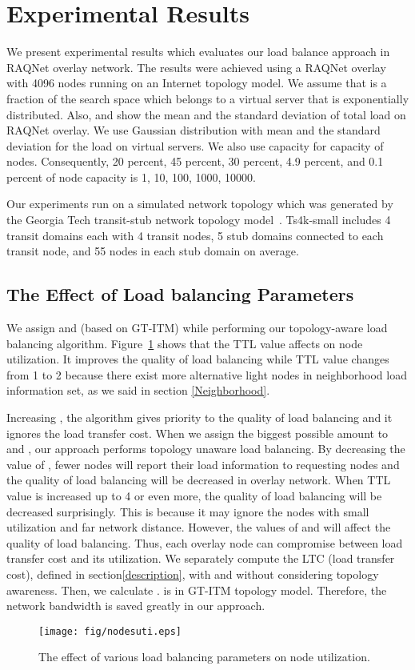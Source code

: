 \documentclass {article}
\begin{document}
\section{Experimental Results}\label{Exresult}
We present experimental results which evaluates our load balance approach in RAQNet overlay network.  The results were achieved using a RAQNet overlay with 4096 nodes  running on an Internet topology model.
We assume that  is a fraction of the search space which belongs to a virtual server that is exponentially  distributed. Also,  and  show the mean and the standard deviation of total load on RAQNet overlay. We use Gaussian distribution with mean  and the standard deviation \cite{loadbalancesp} for the load on virtual servers. We also use 
capacity for capacity of nodes. Consequently, 20 percent,
45 percent, 30 percent, 4.9 percent, and 0.1 percent of node capacity  is  1, 10, 100, 1000, 10000.

Our experiments run on a simulated network topology which was generated by the Georgia Tech transit-stub network topology model~\cite{GT-ITM}. Ts4k-small includes 4 transit domains each with 4 transit
nodes, 5 stub domains connected to each transit node, and 55 nodes in each stub domain on average.
\subsection{The Effect of  Load balancing Parameters }
We assign  and (based on GT-ITM\cite{GT-ITM}) while  performing our topology-aware load balancing algorithm.
Figure~\ref {fig:TTL} shows that the TTL value  affects on  node utilization. It  improves the quality of load balancing while TTL value  changes from 1 to 2 because there exist more alternative light  nodes  in  neighborhood load information set, as we said in section \ref{Neighborhood}.

Increasing  , the algorithm gives priority to the quality of load balancing and it
ignores the load transfer cost. When  we assign the biggest possible amount to  and ,
our approach performs topology unaware load balancing.
By decreasing  the value of , fewer nodes will report their load information to requesting nodes and the quality of load balancing will be decreased in overlay network.
When TTL value is increased up to 4 or even more, the quality of load balancing will be decreased
surprisingly.
This is because
it may ignore the nodes  with small utilization and far network distance. However,   the values of  and   will affect the quality of load balancing. Thus, each overlay node can compromise between load transfer cost and its utilization.
We  separately compute the LTC (load transfer cost), defined in section\ref{description}, with and without considering topology awareness. Then, we calculate
 .  is  in GT-ITM topology model. Therefore, the network bandwidth is saved greatly in our approach.
\begin{figure}[h]
\texttt{[image: fig/nodesuti.eps]}
\caption{The effect of various load balancing parameters   on node utilization.}
\label{fig:TTL}
\end{figure}
\end{document}
